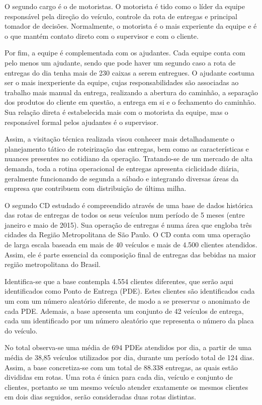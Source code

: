 O segundo cargo é o de motoristas. 
O motorista é tido como o líder da equipe responsável pela direção do veículo, controle da rota de entregas e principal tomador de decisões.
Normalmente, o motorista é o mais experiente da equipe e é o que mantém contato direto com o supervisor e com o cliente.

Por fim, a equipe é complementada com os ajudantes.
Cada equipe conta com pelo menos um ajudante, sendo que pode haver um segundo caso a rota de entregas do dia tenha mais de 230 caixas a serem entregues.
O ajudante costuma ser o mais inexperiente da equipe, cujas responsabilidades são associadas ao trabalho mais manual da entrega, realizando a abertura do caminhão, a separação dos produtos do cliente em questão, a entrega em si e o fechamento do caminhão.
Sua relação direta é estabelecida mais com o motorista da equipe, mas o responsável formal pelos ajudantes é o supervisor.

Assim, a visitação técnica realizada visou conhecer mais detalhadamente o planejamento tático de roteirização das entregas, bem como as características e nuances presentes no cotidiano da operação.
Tratando-se de um mercado de alta demanda, toda a rotina operacional de entregas apresenta ciclicidade diária, geralmente funcionando de segunda a sábado e integrando diversas áreas da empresa que contribuem com distribuição de última milha.

O segundo CD estudado é compreendido através de uma base de dados histórica das rotas de entregas de todos os seus veículos num período de 5 meses (entre janeiro e maio de 2015).
Sua operação de entregas é numa área que engloba três cidades da Região Metropolitana de São Paulo.
O CD conta com uma operação de larga escala  baseada em mais de 40 veículos e mais de 4.500 clientes atendidos.
Assim, ele é parte essencial da composição final de entregas das bebidas na maior região metropolitana do Brasil. 

Identifica-se que a base contempla 4.554 clientes diferentes, que serão aqui identificados como Ponto de Entrega (PDE).
Estes clientes são identificados cada um com um número aleatório diferente, de modo a se preservar o anonimato de cada PDE.
%
Ademais, a base apresenta um conjunto de 42 veículos de entrega, cada um identificado por um número aleatório que representa o número da placa do veículo.

No total observa-se uma média de 694 PDEs atendidos por dia, a partir de uma média de 38,85 veículos utilizados por dia, durante um período total de 124 dias.
Assim, a base concretiza-se com um total de 88.338 entregas, as quais estão divididas em rotas.
Uma rota é única para cada dia, veículo e conjunto de clientes, portanto se um mesmo veículo atender exatamente os mesmos clientes em dois dias seguidos, serão consideradas duas rotas distintas.


